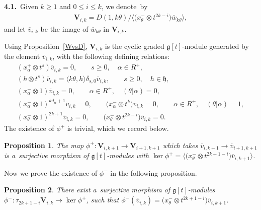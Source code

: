 \documentclass[11pt]{article}
\newtheorem{proposition}{Proposition}
\numberwithin{equation}{section}
\begin{document}
{\bf 4.1.}~Given $k\geq 1$ and $0\leq i \leq k $, we denote~by
\begin{gather*}
\mathbf{V}_{i,k} = D(1, k\theta)/\big\langle \big(x^{-}_\theta \otimes t^{2k-i}\big) \overline{w}_{k\theta} \big\rangle,
\end{gather*}
and let $\overline{v}_{i,k}$ be the image of $\overline{w}_{k\theta}$ in $\mathbf{V}_{i,k}$.

Using Proposition~\ref{WvsD}, $\mathbf{V}_{i,k}$ is the cyclic graded $\mathfrak{g}[t]$-module generated by the element
$\overline{v}_{i,k}$, with the following def\/ining relations:
\begin{gather}
(x^{+}_{\alpha}\otimes t^s)\overline{v}_{i,k}=0,
\qquad
s\geq 0,\quad \alpha\in R^+,
\label{r1}
\\
(h \otimes t^s) \overline{v}_{i,k} = \langle k\theta, h\rangle \delta_{s,0} \overline{v}_{i,k},
\qquad
s\geq0,
\quad
h\in\mathfrak{h},
\label{r2}
\\
(x^{-}_{\alpha}\otimes 1) \overline{v}_{i,k}=0,
\qquad
\alpha\in R^+,
\quad
(\theta|\alpha)=0,
\label{r3}
\\
(x^{-}_{\alpha}\otimes 1)^{kd_{\alpha}+1} \overline{v}_{i,k}=0,
\qquad
\big(x^{-}_{\alpha} \otimes t^k\big) \overline{v}_{i,k}=0,
\qquad
\alpha\in R^+,
\quad
(\theta|\alpha)=1,
\label{r4}
\\
(x^{-}_{\theta}\otimes 1)^{2k+1} \overline{v}_{i,k}=0,
\qquad
\big(x^{-}_{\theta} \otimes t^{2k-i}\big) \overline{v}_{i,k}=0.
\label{r5}
\end{gather}
The existence of $\phi^{+}$ is trivial, which we record below.
\begin{proposition}
The map $\phi^{+} : \mathbf{V}_{i,k+1} \rightarrow \mathbf{V}_{i+1,k+1}$ which takes $\overline{v}_{i,k+1}
\rightarrow \overline{v}_{i+1,k+1}$ is a~surjective morphism of $\mathfrak{g}[t]$-modules with $\ker \phi^{+} = \big\langle
\big({x^{-}_\theta} \otimes t^{2k+1-i}\big) \overline{v}_{i,k+1}\big\rangle$.
\end{proposition}

Now we prove the existence of $\phi^{-}$ in the following proposition.
\begin{proposition}
There exist a~surjective morphism of $\mathfrak{g}[t]$-modules $\phi^{-} : \tau_{2k+1-i} \mathbf{V}_{i,k}
\rightarrow \ker \phi^{+}$,
such that $\phi^{-}(\overline{v}_{i,k}) = \big(x^{-}_\theta \otimes t^{2k+1-i}\big) \overline{v}_{i,k+1}$.
\end{proposition}
\end{document}
